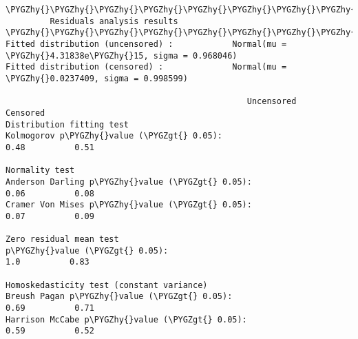 \documentclass[letterpaper,10pt,english]{sphinxmanual}
\def\PYGZgt{\char`\>}
\def\PYGZhy{\char`\-}
\begin{document}
\begin{Verbatim}[commandchars=\\\{\}]
\PYGZhy{}\PYGZhy{}\PYGZhy{}\PYGZhy{}\PYGZhy{}\PYGZhy{}\PYGZhy{}\PYGZhy{}\PYGZhy{}\PYGZhy{}\PYGZhy{}\PYGZhy{}\PYGZhy{}\PYGZhy{}\PYGZhy{}\PYGZhy{}\PYGZhy{}\PYGZhy{}\PYGZhy{}\PYGZhy{}\PYGZhy{}\PYGZhy{}\PYGZhy{}\PYGZhy{}\PYGZhy{}\PYGZhy{}\PYGZhy{}\PYGZhy{}\PYGZhy{}\PYGZhy{}\PYGZhy{}\PYGZhy{}\PYGZhy{}\PYGZhy{}\PYGZhy{}\PYGZhy{}\PYGZhy{}\PYGZhy{}\PYGZhy{}\PYGZhy{}\PYGZhy{}\PYGZhy{}\PYGZhy{}\PYGZhy{}\PYGZhy{}\PYGZhy{}\PYGZhy{}\PYGZhy{}\PYGZhy{}\PYGZhy{}\PYGZhy{}\PYGZhy{}\PYGZhy{}\PYGZhy{}\PYGZhy{}\PYGZhy{}\PYGZhy{}\PYGZhy{}\PYGZhy{}\PYGZhy{}\PYGZhy{}\PYGZhy{}\PYGZhy{}\PYGZhy{}\PYGZhy{}\PYGZhy{}\PYGZhy{}\PYGZhy{}\PYGZhy{}\PYGZhy{}\PYGZhy{}\PYGZhy{}\PYGZhy{}\PYGZhy{}\PYGZhy{}\PYGZhy{}\PYGZhy{}\PYGZhy{}\PYGZhy{}\PYGZhy{}
         Residuals analysis results
\PYGZhy{}\PYGZhy{}\PYGZhy{}\PYGZhy{}\PYGZhy{}\PYGZhy{}\PYGZhy{}\PYGZhy{}\PYGZhy{}\PYGZhy{}\PYGZhy{}\PYGZhy{}\PYGZhy{}\PYGZhy{}\PYGZhy{}\PYGZhy{}\PYGZhy{}\PYGZhy{}\PYGZhy{}\PYGZhy{}\PYGZhy{}\PYGZhy{}\PYGZhy{}\PYGZhy{}\PYGZhy{}\PYGZhy{}\PYGZhy{}\PYGZhy{}\PYGZhy{}\PYGZhy{}\PYGZhy{}\PYGZhy{}\PYGZhy{}\PYGZhy{}\PYGZhy{}\PYGZhy{}\PYGZhy{}\PYGZhy{}\PYGZhy{}\PYGZhy{}\PYGZhy{}\PYGZhy{}\PYGZhy{}\PYGZhy{}\PYGZhy{}\PYGZhy{}\PYGZhy{}\PYGZhy{}\PYGZhy{}\PYGZhy{}\PYGZhy{}\PYGZhy{}\PYGZhy{}\PYGZhy{}\PYGZhy{}\PYGZhy{}\PYGZhy{}\PYGZhy{}\PYGZhy{}\PYGZhy{}\PYGZhy{}\PYGZhy{}\PYGZhy{}\PYGZhy{}\PYGZhy{}\PYGZhy{}\PYGZhy{}\PYGZhy{}\PYGZhy{}\PYGZhy{}\PYGZhy{}\PYGZhy{}\PYGZhy{}\PYGZhy{}\PYGZhy{}\PYGZhy{}\PYGZhy{}\PYGZhy{}\PYGZhy{}\PYGZhy{}
Fitted distribution (uncensored) :            Normal(mu = \PYGZhy{}4.31838e\PYGZhy{}15, sigma = 0.968046)
Fitted distribution (censored) :              Normal(mu = \PYGZhy{}0.0237409, sigma = 0.998599)

                                                 Uncensored      Censored
Distribution fitting test
Kolmogorov p\PYGZhy{}value (\PYGZgt{} 0.05):                           0.48          0.51

Normality test
Anderson Darling p\PYGZhy{}value (\PYGZgt{} 0.05):                     0.06          0.08
Cramer Von Mises p\PYGZhy{}value (\PYGZgt{} 0.05):                     0.07          0.09

Zero residual mean test
p\PYGZhy{}value (\PYGZgt{} 0.05):                                       1.0          0.83

Homoskedasticity test (constant variance)
Breush Pagan p\PYGZhy{}value (\PYGZgt{} 0.05):                         0.69          0.71
Harrison McCabe p\PYGZhy{}value (\PYGZgt{} 0.05):                      0.59          0.52


\end{Verbatim}
\end{document}
